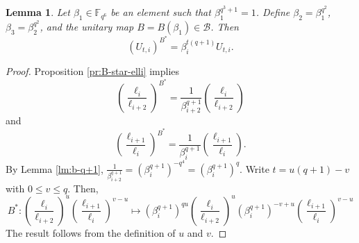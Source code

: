 \documentclass[11pt]{amsart}
\theoremstyle{plain}
\newtheorem{lemma}[theorem]{Lemma}
\theoremstyle{definition}
\theoremstyle{remark}
\begin{document}
\begin{lemma} \label{lm:B-start-on-U}
Let $\beta_1 \in \mathbb{F}_{q^6}$ be an element such that $\beta_1^{q^3+1}=1$. Define $\beta_2=\beta_1^{q^2}$, $\beta_3=\beta_2^{q^2}$, and the unitary map $B=B(\beta_1) \in \mathcal{B}$. Then
\[(U_{t,i})^{B^*} = \beta_i^{t(q+1)} U_{t,i}.\]
\end{lemma}
\begin{proof}
Proposition \ref{pr:B-star-elli} implies
\[\left(\frac{\ell_i}{\ell_{i+2}}\right)^{B^*} = \frac{1}{\beta_{i+2}^{q+1}}\left(\frac{\ell_i}{\ell_{i+2}}\right)\]
and
\[\left(\frac{\ell_{i+1}}{\ell_{i}}\right)^{B^*} = \frac{1}{\beta_{i}^{q+1}}
\left(\frac{\ell_{i+1}}{\ell_{i}}\right).\]
By Lemma \ref{lm:b-q+1}, $\frac{1}{\beta_{i+2}^{q+1}} = (\beta_{i}^{q+1})^{-q^4} = (\beta_{i}^{q+1})^{q}$. Write $t=u(q+1)-v$ with $0\leq v\leq q$. Then, 
\[B^*: \left(\frac{\ell_i}{\ell_{i+2}}\right)^u\left(\frac{\ell_{i+1}}{\ell_i}\right)^{v-u} \mapsto (\beta_i^{q+1})^{qu}  \left(\frac{\ell_i}{\ell_{i+2}}\right)^u (\beta_{i}^{q+1})^{-v+u} \left(\frac{\ell_{i+1}}{\ell_i}\right)^{v-u}\]
The result follows from the definition of $u$ and $v$. 
\end{proof}
\end{document}
